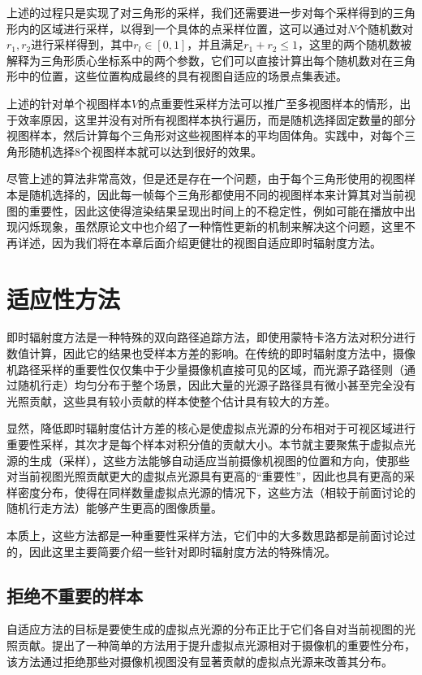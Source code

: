 上述的过程只是实现了对三角形的采样，我们还需要进一步对每个采样得到的三角形内的区域进行采样，以得到一个具体的点采样位置，这可以通过对$N$个随机数对$r_1,r_2$进行采样得到，其中$r_l\in[0,1]$，并且满足$r_1+r_2\leq 1$，这里的两个随机数被解释为三角形质心坐标系中的两个参数，它们可以直接计算出每个随机数对在三角形中的位置，这些位置构成最终的具有视图自适应的场景点集表述。

上述的针对单个视图样本$V$的点重要性采样方法可以推广至多视图样本的情形，出于效率原因，这里并没有对所有视图样本执行遍历，而是随机选择固定数量的部分视图样本，然后计算每个三角形对这些视图样本的平均固体角。实践中，对每个三角形随机选择8个视图样本就可以达到很好的效果。

尽管上述的算法非常高效，但是还是存在一个问题，由于每个三角形使用的视图样本是随机选择的，因此每一帧每个三角形都使用不同的视图样本来计算其对当前视图的重要性，因此这使得渲染结果呈现出时间上的不稳定性，例如可能在播放中出现闪烁现象，虽然原论文中也介绍了一种惰性更新的机制来解决这个问题，这里不再详述，因为我们将在本章后面介绍更健壮的视图自适应即时辐射度方法。




\section{适应性方法}
即时辐射度方法是一种特殊的双向路径追踪方法，即使用蒙特卡洛方法对积分进行数值计算，因此它的结果也受样本方差的影响。在传统的即时辐射度方法中，摄像机路径采样的重要性仅仅集中于少量摄像机直接可见的区域，而光源子路径则（通过随机行走）均匀分布于整个场景，因此大量的光源子路径具有微小甚至完全没有光照贡献，这些具有较小贡献的样本使整个估计具有较大的方差。

显然，降低即时辐射度估计方差的核心是使虚拟点光源的分布相对于可视区域进行重要性采样，其次才是每个样本对积分值的贡献大小。本节就主要聚焦于虚拟点光源的生成（采样），这些方法能够自动适应当前摄像机视图的位置和方向，使那些对当前视图光照贡献更大的虚拟点光源具有更高的“重要性”，因此也具有更高的采样密度分布，使得在同样数量虚拟点光源的情况下，这些方法（相较于前面讨论的随机行走方法）能够产生更高的图像质量。

本质上，这些方法都是一种重要性采样方法，它们中的大多数思路都是前面讨论过的，因此这里主要简要介绍一些针对即时辐射度方法的特殊情况。




\subsection{拒绝不重要的样本}
自适应方法的目标是要使生成的虚拟点光源的分布正比于它们各自对当前视图的光照贡献。\cite{a:SimpleandRobustIterativeImportanceSamplingofVirtualPointLights}提出了一种简单的方法用于提升虚拟点光源相对于摄像机的重要性分布，该方法通过拒绝那些对摄像机视图没有显著贡献的虚拟点光源来改善其分布。

